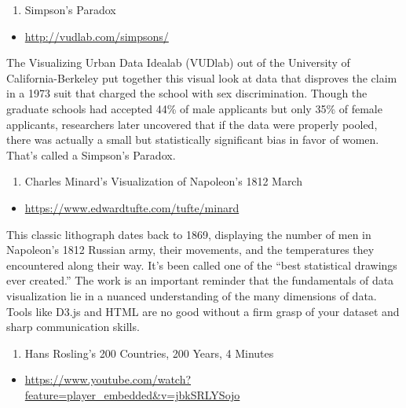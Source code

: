 \documentclass[]{book}
\providecommand{\tightlist}{%
  \setlength{\itemsep}{0pt}\setlength{\parskip}{0pt}}
\theoremstyle{definition}
\theoremstyle{definition}
\theoremstyle{definition}
\theoremstyle{remark}
\begin{document}
\begin{enumerate}
\def\labelenumi{\arabic{enumi}.}
\setcounter{enumi}{1}
\tightlist
\item
  Simpson's Paradox
\end{enumerate}

\begin{itemize}
\tightlist
\item
  \url{http://vudlab.com/simpsons/}
\end{itemize}

The Visualizing Urban Data Idealab (VUDlab) out of the University of
California-Berkeley put together this visual look at data that disproves
the claim in a 1973 suit that charged the school with sex
discrimination. Though the graduate schools had accepted 44\% of male
applicants but only 35\% of female applicants, researchers later
uncovered that if the data were properly pooled, there was actually a
small but statistically significant bias in favor of women. That's
called a Simpson's Paradox.

\begin{enumerate}
\def\labelenumi{\arabic{enumi}.}
\setcounter{enumi}{2}
\tightlist
\item
  Charles Minard's Visualization of Napoleon's 1812 March
\end{enumerate}

\begin{itemize}
\tightlist
\item
  \url{https://www.edwardtufte.com/tufte/minard}
\end{itemize}

This classic lithograph dates back to 1869, displaying the number of men
in Napoleon's 1812 Russian army, their movements, and the temperatures
they encountered along their way. It's been called one of the ``best
statistical drawings ever created.'' The work is an important reminder
that the fundamentals of data visualization lie in a nuanced
understanding of the many dimensions of data. Tools like D3.js and HTML
are no good without a firm grasp of your dataset and sharp communication
skills.

\begin{enumerate}
\def\labelenumi{\arabic{enumi}.}
\setcounter{enumi}{3}
\tightlist
\item
  Hans Rosling's 200 Countries, 200 Years, 4 Minutes
\end{enumerate}

\begin{itemize}
\tightlist
\item
  \url{https://www.youtube.com/watch?feature=player_embedded\&v=jbkSRLYSojo}
\end{itemize}
\end{document}
